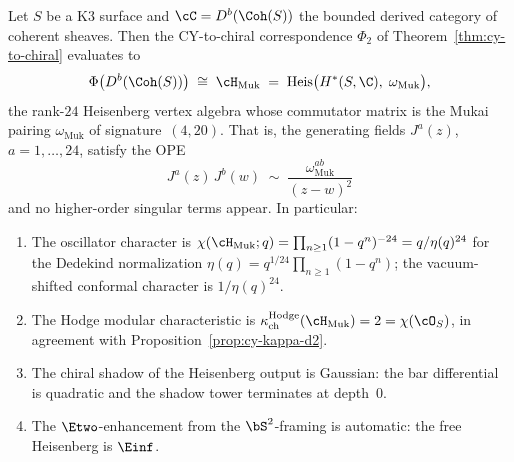 \begin{theorem}
\label{thm:phi-k3-explicit}
Let $S$ be a K3 surface and $\cC = D^b(\Coh(S))$ the bounded derived category of coherent sheaves. Then the CY-to-chiral correspondence $\Phi_2$ of Theorem~\textup{\ref{thm:cy-to-chiral}} evaluates to
\[
 \Phi\bigl(D^b(\Coh(S))\bigr) \;\cong\; \cH_{\mathrm{Muk}} \;=\; \mathrm{Heis}\bigl(H^*(S, \C),\; \omega_{\mathrm{Muk}}\bigr),
\]
the rank-$24$ Heisenberg vertex algebra whose commutator matrix is the Mukai pairing $\omega_{\mathrm{Muk}}$ of signature~$(4, 20)$. That is, the generating fields $J^a(z)$, $a = 1, \ldots, 24$, satisfy the OPE
\[
 J^a(z) \, J^b(w) \;\sim\; \frac{\omega_{\mathrm{Muk}}^{ab}}{(z - w)^2}
\]
and no higher-order singular terms appear. In particular:
\begin{enumerate}[label=\textup{(\roman*)}]
 \item The oscillator character is $\chi(\cH_{\mathrm{Muk}}; q) = \prod_{n \geq 1}(1 - q^n)^{-24}=q/\eta(q)^{24}$ for the Dedekind normalization $\eta(q)=q^{1/24}\prod_{n\geq1}(1-q^n)$; the vacuum-shifted conformal character is $1/\eta(q)^{24}$.
 \item The Hodge modular characteristic is $\kappa_{\mathrm{ch}}^{\mathrm{Hodge}}(\cH_{\mathrm{Muk}}) = 2 = \chi(\cO_S)$, in agreement with Proposition~\textup{\ref{prop:cy-kappa-d2}}.
 \item The chiral shadow of the Heisenberg output is Gaussian: the bar differential is quadratic and the shadow tower terminates at depth~$0$.
 \item The $\Etwo$-enhancement from the $\bS^2$-framing is automatic: the free Heisenberg is $\Einf$.
\end{enumerate}
\end{theorem}

